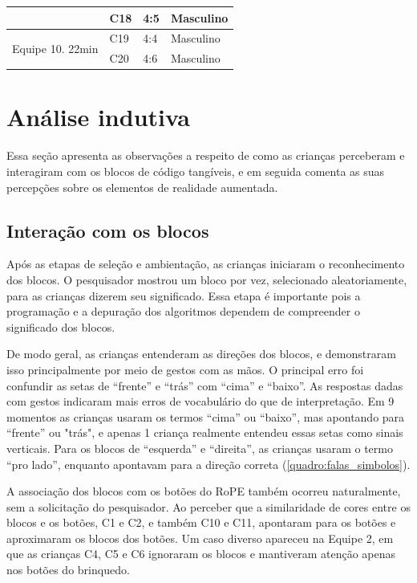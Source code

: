 \begin{quadro}[!h]
{\begin{footnotesize}
{\begin{tabular}{|l|l|l|l|}
                                                                                        & C18              & 4:5                            & Masculino \\ 
            \hline
            \multirow{2}{*}{Equipe 10. 22min}               & C19              & 4:4                            & Masculino \\ 
            \cline{2-4}
                                                                                        & C20              & 4:6                            & Masculino  \\
            \hline
            \end{tabular}
        }
        \end{footnotesize}
    }
\end{quadro}

\section{Análise indutiva}
Essa seção apresenta as observações a respeito de como as crianças perceberam e interagiram com os blocos de código tangíveis, e em seguida comenta as suas percepções sobre os elementos de realidade aumentada. 

\subsection{Interação com os blocos}

Após as etapas de seleção e ambientação, as crianças iniciaram o reconhecimento dos blocos. O pesquisador mostrou um bloco por vez, selecionado aleatoriamente, para as crianças dizerem seu significado. Essa etapa é importante pois a programação e a depuração dos algoritmos dependem de compreender o significado dos blocos. 

De modo geral, as crianças entenderam as direções dos blocos, e demonstraram isso principalmente por meio de gestos com as mãos. O principal erro foi confundir as setas de “frente” e “trás” com “cima” e “baixo”. As respostas dadas com gestos indicaram mais erros de vocabulário do que de interpretação. Em 9 momentos as crianças usaram os termos “cima” ou “baixo”, mas apontando para “frente” ou "trás", e apenas 1 criança realmente entendeu essas setas como sinais verticais. Para os blocos de “esquerda” e “direita”, as crianças usaram o termo “pro lado”, enquanto apontavam para a direção correta (\autoref{quadro:falas_simbolos}).

A associação dos blocos com os botões do RoPE também ocorreu naturalmente, sem a solicitação do pesquisador. Ao perceber que a similaridade de cores entre os blocos e os botões, C1 e C2, e também C10 e C11, apontaram para os botões e aproximaram os blocos dos botões. Um caso diverso apareceu na Equipe 2, em que as crianças C4, C5 e C6 ignoraram os blocos e mantiveram atenção apenas nos botões do brinquedo.

